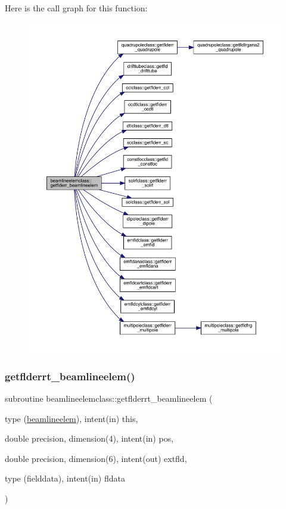 Here is the call graph for this function\+:\nopagebreak
\begin{figure}[H]
\begin{center}
\leavevmode
\includegraphics[width=350pt]{namespacebeamlineelemclass_aa711cecfd3c01152cb0d88d88b645c4b_cgraph}
\end{center}
\end{figure}
\mbox{\label{namespacebeamlineelemclass_a7684dcfae71c895630dae0e95476e203}} 
\subsubsection{\texorpdfstring{getflderrt\_beamlineelem()}{getflderrt\_beamlineelem()}}
{\footnotesize\ttfamily subroutine beamlineelemclass\+::getflderrt\+\_\+beamlineelem (\begin{DoxyParamCaption}\item[{type (\mbox{\hyperlink{namespacebeamlineelemclass_structbeamlineelemclass_1_1beamlineelem}{beamlineelem}}), intent(in)}]{this,  }\item[{double precision, dimension(4), intent(in)}]{pos,  }\item[{double precision, dimension(6), intent(out)}]{extfld,  }\item[{type (fielddata), intent(in)}]{fldata }\end{DoxyParamCaption})}

